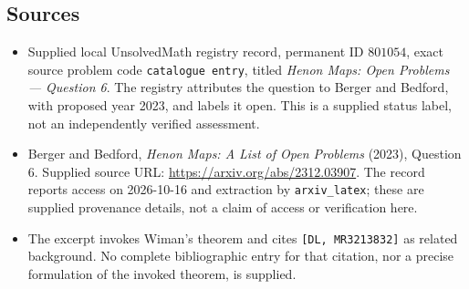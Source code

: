 \documentclass[11pt]{article}
\begin{document}
\subsection{Sources}
\begin{itemize}
\item Supplied local UnsolvedMath registry record, permanent ID \(801054\), exact source problem code \texttt{catalogue entry}, titled \emph{Henon Maps: Open Problems --- Question 6}. The registry attributes the question to Berger and Bedford, with proposed year 2023, and labels it open. This is a supplied status label, not an independently verified assessment.
\item Berger and Bedford, \emph{Henon Maps: A List of Open Problems} (2023), Question 6. Supplied source URL: \url{https://arxiv.org/abs/2312.03907}. The record reports access on 2026-10-16 and extraction by \texttt{arxiv\_latex}; these are supplied provenance details, not a claim of access or verification here.
\item The excerpt invokes Wiman's theorem and cites \texttt{[DL, MR3213832]} as related background. No complete bibliographic entry for that citation, nor a precise formulation of the invoked theorem, is supplied.
\end{itemize}
\end{document}
